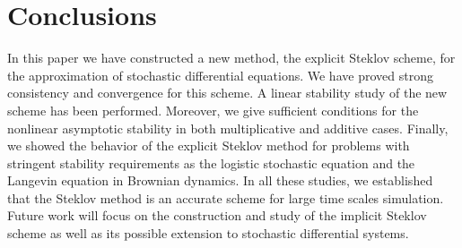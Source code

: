 \section{Conclusions}\label{sec6}
In this paper we have constructed a new method, the explicit Steklov scheme, for the
approximation of stochastic differential equations. We have proved strong consistency and
convergence for this scheme. A linear stability study  of the new scheme has been
performed. Moreover, we give sufficient conditions for the nonlinear asymptotic stability
in both multiplicative and additive cases. Finally, we showed the behavior of the explicit
Steklov method for  problems  with stringent stability requirements as the logistic
stochastic equation and the Langevin equation in Brownian dynamics. In all these studies,
we established that the Steklov method is an accurate scheme for  large time scales
simulation. Future work will focus on the construction and study  of the implicit Steklov
scheme as well as its possible extension to stochastic differential systems.
\appendix
%
%
% 
